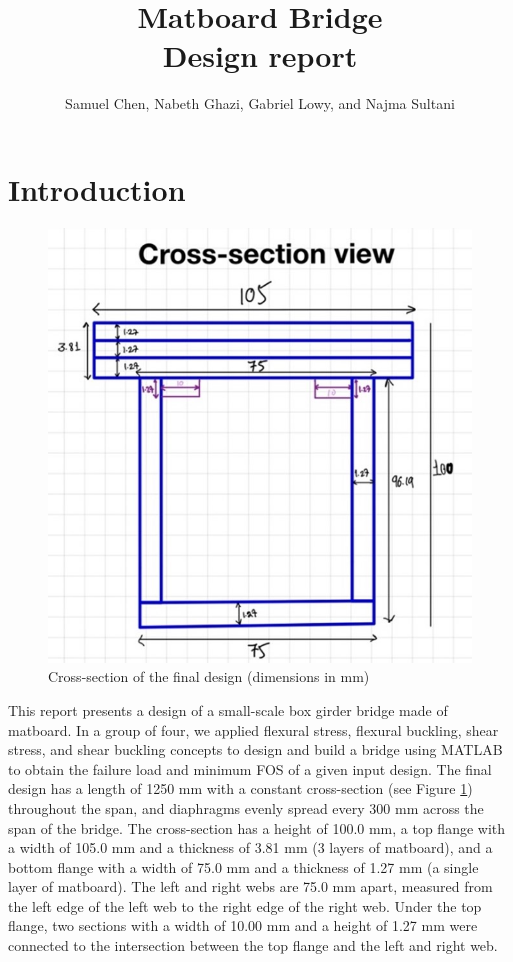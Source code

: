 \documentclass[11pt]{article}
\newcommand{\imagewidth}{.5\linewidth}
\begin{document}
\clearpage
{}
\title{Matboard Bridge\\ \textbf{Design report}}
\author{Samuel Chen, Nabeth Ghazi, Gabriel Lowy, and Najma Sultani}
\date{}
\maketitle

\tableofcontents

\clearpage
{}

\section{Introduction}

\begin{figure}[h]
    \centering
    \includegraphics[width=\imagewidth]{img/design-7-cs.jpg}
    \caption{Cross-section of the final design (dimensions in mm)}
    \label{dfin}
\end{figure}

This report presents a design of a small-scale box girder bridge made of matboard. In a group of four, we applied flexural stress, flexural buckling, shear stress, and shear buckling concepts to design and build a bridge using MATLAB to obtain the failure load and minimum FOS of a given input design. The final design has a length of 1250 mm with a constant cross-section (see Figure \ref{dfin}) throughout the span, and diaphragms evenly spread every 300 mm across the span of the bridge. The cross-section has a height of 100.0 mm, a top flange with a width of 105.0 mm and a thickness of 3.81 mm (3 layers of matboard), and a bottom flange with a width of 75.0 mm and a thickness of 1.27 mm (a single layer of matboard). The left and right webs are 75.0 mm apart, measured from the left edge of the left web to the right edge of the right web. Under the top flange, two sections with a width of 10.00 mm and a height of 1.27 mm were connected to the intersection between the top flange and the left and right web.
\end{document}
